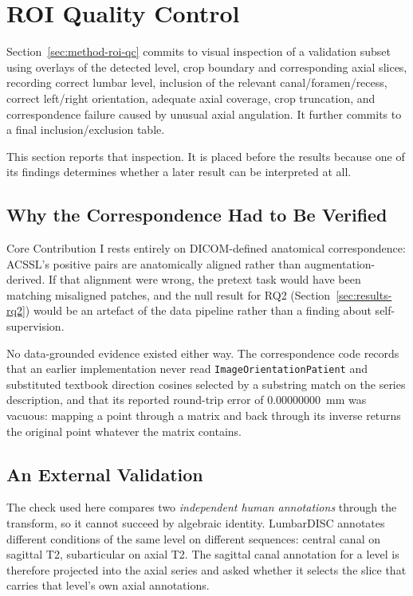 \documentclass[12pt,a4paper]{report}
\begin{document}
\section{ROI Quality Control}
\label{sec:results-roiqc}

Section~\ref{sec:method-roi-qc} commits to visual inspection of a validation
subset using overlays of the detected level, crop boundary and corresponding
axial slices, recording correct lumbar level, inclusion of the relevant
canal/foramen/recess, correct left/right orientation, adequate axial coverage,
crop truncation, and correspondence failure caused by unusual axial angulation.
It further commits to a final inclusion/exclusion table.

This section reports that inspection. It is placed before the results because
one of its findings determines whether a later result can be interpreted at all.

\subsection{Why the Correspondence Had to Be Verified}

Core Contribution I rests entirely on DICOM-defined anatomical correspondence:
ACSSL's positive pairs are anatomically aligned rather than augmentation-derived.
If that alignment were wrong, the pretext task would have been matching
misaligned patches, and the null result for RQ2
(Section~\ref{sec:results-rq2}) would be an artefact of the data pipeline rather
than a finding about self-supervision.

No data-grounded evidence existed either way. The correspondence code records
that an earlier implementation never read \texttt{ImageOrientationPatient} and
substituted textbook direction cosines selected by a substring match on the
series description, and that its reported round-trip error of $0.00000000$~mm
was vacuous: mapping a point through a matrix and back through its inverse
returns the original point whatever the matrix contains.

\subsection{An External Validation}

The check used here compares two \emph{independent human annotations} through
the transform, so it cannot succeed by algebraic identity. LumbarDISC annotates
different conditions of the same level on different sequences: central canal on
sagittal T2, subarticular on axial T2. The sagittal canal annotation for a level
is therefore projected into the axial series and asked whether it selects the
slice that carries that level's own axial annotations.
\end{document}
